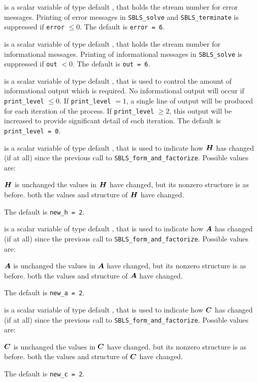 \documentclass{galahad}
\newcommand{\packagename}{SBLS}
\begin{document}
\begin{description}

 is a scalar variable of type default \integer, that holds the
stream number for error messages. Printing of error messages in 
{\tt \packagename\_solve} and {\tt \packagename\_terminate} 
is suppressed if {\tt error} $\leq 0$.
The default is {\tt error = 6}.

 is a scalar variable of type default \integer, that holds the
stream number for informational messages. Printing of informational messages in 
{\tt \packagename\_solve} is suppressed if {\tt out} $< 0$.
The default is {\tt out = 6}.

 is a scalar variable of type default \integer, that is used
to control the amount of informational output which is required. No 
informational output will occur if {\tt print\_level} $\leq 0$. If 
{\tt print\_level} $= 1$, a single line of output will be produced for each
iteration of the process. If {\tt print\_level} $\geq 2$, this output will be
increased to provide significant detail of each iteration.
The default is {\tt print\_level = 0}.

 is a scalar variable of type default \integer, that is used
to indicate how ${\bm{H}}$ has changed (if at all) since the previous call
to {\tt SBLS\_form\_and\_factorize}. Possible values are:
\begin{description}
 ${\bm{H}}$ is unchanged
 the values in ${\bm{H}}$ have changed, but its nonzero structure 
is as before.
 both the values and structure of ${\bm{H}}$ have changed.
\end{description}
The default is {\tt new\_h = 2}.

 is a scalar variable of type default \integer, that is used
to indicate how ${\bm{A}}$ has changed (if at all) since the previous call
to {\tt SBLS\_form\_and\_factorize}. Possible values are:
\begin{description}
 ${\bm{A}}$ is unchanged
 the values in ${\bm{A}}$ have changed, but its nonzero structure 
is as before.
 both the values and structure of ${\bm{A}}$ have changed.
\end{description}
The default is {\tt new\_a = 2}.

 is a scalar variable of type default \integer, that is used
to indicate how ${\bm{C}}$ has changed (if at all) since the previous call
to {\tt SBLS\_form\_and\_factorize}. Possible values are:
\begin{description}
 ${\bm{C}}$ is unchanged
 the values in ${\bm{C}}$ have changed, but its nonzero structure 
is as before.
 both the values and structure of ${\bm{C}}$ have changed.
\end{description}
The default is {\tt new\_c = 2}.


\end{description}
\end{document}
